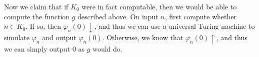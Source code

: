 \documentclass{article}
\newcommand{\halts}{\downarrow}
\newcommand{\nhalts}{\uparrow}
\begin{document}
Now we claim that if $K_0$ were in fact computable, then we would be able to compute the function $g$ described above.
On input $n$, first compute whether $n \in K_0$.
If so, then $\varphi_n(0) \halts$, and thus we can use a universal Turing machine to simulate $\varphi_n$ and output $\varphi_n(0)$.
Otherwise, we know that $\varphi_n(0) \nhalts$, and thus we can simply output 0 as $g$ would do.
\end{document}
